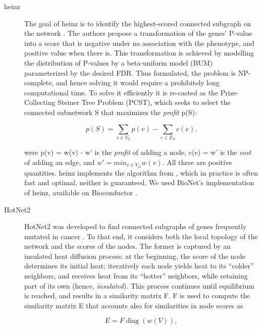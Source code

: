 \documentclass[twocolumn, 11pt, draft]{article}
\begin{document}
\begin{description}
\item[{heinz}] The goal of heinz is to identify the highest-scored connected subgraph on the network \cite{dittrich_identifying_2008}. The authors propose a transformation of the genes' P-value into a score that is negative under no association with the phenotype, and positive value when there is. This transformation is achieved by modelling the distribution of P-values by a beta-uniform model (BUM) parameterized by the desired FDR. Thus formulated, the problem is NP-complete, and hence solving it would require a prohibitely long computational time. To solve it efficiently it is re-casted as the Prize-Collecting Steiner Tree Problem (PCST), which seeks to select the connected subnetwork S that maximizes the \emph{profit} p(S):

\begin{equation*}
p(S) = \sum_{v \in V_S} p(v) - \sum_{e \in E_S} c(e). 
\end{equation*}

were p(v) = w(v) - w' is the \emph{profit} of adding a node, c(e) = w' is the \emph{cost} of adding an edge, and $w' = min_{v \in V_{G}} w(v)$. All three are positive quantities. heinz implements the algorithm from \citet{ljubic_algorithmic_2006}, which in practice is often fast and optimal, neither is guaranteed. We used BioNet's implementation of heinz, available on Bioconductor \cite{beisser_bionet:_2010,heinz}.

\item[{HotNet2}] HotNet2 was developed to find connected subgraphs of genes frequently mutated in cancer \cite{leiserson_pan-cancer_2015}. To that end, it considers both the local topology of the network and the scores of the nodes. The former is captured by an insulated heat diffusion process: at the beginning, the score of the node determines its initial heat; iteratively each node yields heat to its ``colder'' neighbors, and receives heat from its ``hotter'' neighbors, while retaining part of its own (hence, \emph{insulated}). This process continues until equilibrium is reached, and results in a similarity matrix F. F is used to compute the similarity matrix E that accounts also for similarities in node scores as 

\begin{equation*} 
E = F \operatorname{diag}(w(V)), 
\end{equation*}


\end{description}
\end{document}
